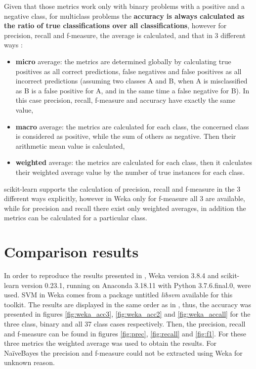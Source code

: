 Given that those metrics work only with binary problems with a positive and a negative class, for multiclass problems the \textbf{accuracy is always calculated as the ratio of true classifications over all classifications}, however for precision, recall and f-measure, the average is calculated, and that in 3 different ways \cite{shmueli_multi-class_2020}:

\begin{itemize}
    \item \textbf{micro} average: the metrics are determined globally by calculating true positives as all correct predictions, false negatives and false positives as all incorrect predictions (assuming two classes A and B, when A is misclassified as B is a false positive for A, and in the same time a false negative for B). In this case precision, recall, f-measure and accuracy have exactly the same value,
    \item \textbf{macro} average: the metrics are calculated for each class, the concerned class is considered as positive, while the sum of others as negative. Then their arithmetic mean value is calculated,
    \item \textbf{weighted} average: the metrics are calculated for each class, then it calculates their weighted average value by the number of true instances for each class.
\end{itemize}

scikit-learn supports the calculation of precision, recall and f-measure in the 3 different ways explicitly, however in Weka only for f-measure all 3 are available, while for precision and recall there exist only weighted averages, in addition the metrics can be calculated for a particular class. 

\section{Comparison results}
In order to reproduce the results presented in \cite{borges_hink_machine_2014-1}, Weka version 3.8.4 and scikit-learn version 0.23.1, running on Anaconda 3.18.11 with Python 3.7.6.final.0, were used. SVM in Weka comes from a package untitled \textit{libsvm} available for this toolkit. The results are displayed in the same order as in \cite{borges_hink_machine_2014-1}, thus, the accuracy was presented in figures \ref{fig:weka_acc3}, \ref{fig:weka_acc2} and \ref{fig:weka_accall} for the three class, binary and all 37 class cases respectively. Then, the precision, recall and f-measure can be found in figures \ref{fig:prec}, \ref{fig:recall} and \ref{fig:f1}. For these three metrics the weighted average was used to obtain the results. For NaïveBayes the precision and f-measure could not be extracted using Weka for unknown reason.

